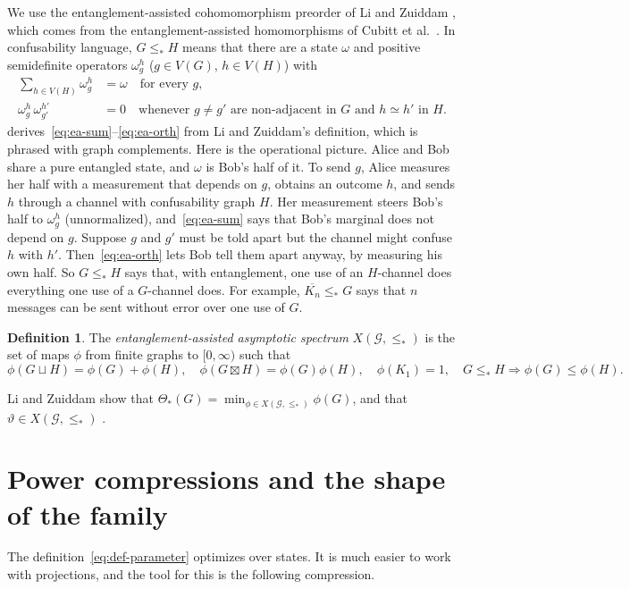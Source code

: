 \documentclass[11pt]{article}
\theoremstyle{definition}
\newtheorem{definition}[theorem]{Definition}
\newcommand{\vt}{\vartheta}
\newcommand{\cG}{\mathcal G}
\newcommand{\Xs}{X(\cG,\le_*)}
\newcommand{\boxt}{\boxtimes}
\begin{document}
We use the entanglement-assisted cohomomorphism preorder of Li and Zuiddam
\cite{LiZuiddam2020}, which comes from the entanglement-assisted
homomorphisms of Cubitt et al.~\cite{CMRSSW2014}.  In confusability language,
$G\le_*H$ means that there are a state $\omega$ and positive semidefinite
operators $\omega_g^h$ ($g\in V(G)$, $h\in V(H)$) with
\begin{align}
 \sum_{h\in V(H)}\omega_g^h&=\omega\quad\text{for every }g,\label{eq:ea-sum}\\
 \omega_g^h\,\omega_{g'}^{h'}&=0\quad\text{whenever $g\ne g'$ are non-adjacent
 in $G$ and $h\simeq h'$ in $H$.}\label{eq:ea-orth}
\end{align}
 derives~\eqref{eq:ea-sum}--\eqref{eq:ea-orth} from
Li and Zuiddam's definition, which is phrased with graph complements.
Here is the operational picture.  Alice and Bob share a pure entangled state,
and $\omega$ is Bob's half of it.  To send $g$, Alice measures her half with a
measurement that depends on $g$, obtains an outcome $h$, and sends $h$ through
a channel with confusability graph $H$.  Her measurement steers Bob's half to
$\omega_g^h$ (unnormalized), and~\eqref{eq:ea-sum} says that Bob's marginal
does not depend on $g$.  Suppose $g$ and $g'$ must be told apart but the
channel might confuse $h$ with $h'$.  Then~\eqref{eq:ea-orth} lets Bob tell
them apart anyway, by measuring his own half.  So $G\le_*H$ says that, with
entanglement, one use of an $H$-channel does everything one use of a
$G$-channel does.  For example, $\overline{K_n}\le_*G$ says that $n$ messages
can be sent without error over one use of $G$.

\begin{definition}
The \emph{entanglement-assisted asymptotic spectrum} $\Xs$ is the set of maps
$\phi$ from finite graphs to $[0,\infty)$ such that
\[
 \phi(G\sqcup H)=\phi(G)+\phi(H),\quad
 \phi(G\boxt H)=\phi(G)\phi(H),\quad
 \phi(K_1)=1,\quad
 G\le_*H\Rightarrow\phi(G)\le\phi(H).
\]
\end{definition}

Li and Zuiddam show that $\Theta_*(G)=\min_{\phi\in\Xs}\phi(G)$, and that
$\vt\in\Xs$ \cite{LiZuiddam2020}.

\section{Power compressions and the shape of the family}
\label{sec:compressions}

The definition~\eqref{eq:def-parameter} optimizes over states.  It is much
easier to work with projections, and the tool for this is the following
compression.
\end{document}

